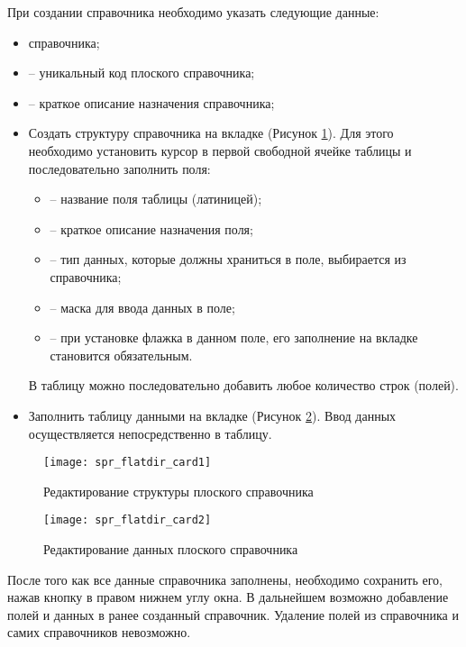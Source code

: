 При создании справочника необходимо указать следующие данные:
\begin{itemize}
 \item {} справочника;
 \item {} -- уникальный код плоского справочника;
 \item {} -- краткое описание назначения справочника;
 \item Создать структуру справочника на вкладке  (Рисунок \ref{img_spr_flatdir_card1}). Для этого необходимо установить курсор в первой свободной ячейке таблицы и последовательно заполнить поля:
  \begin{itemize}
   \item {} -- название поля таблицы (латиницей);
   \item {} -- краткое описание назначения поля;
   \item {} -- тип данных, которые должны храниться в поле, выбирается из справочника;
   \item {} -- маска для ввода данных в поле;
   \item {} -- при установке флажка в данном поле, его заполнение на вкладке  становится обязательным.
  \end{itemize}
 В таблицу можно последовательно добавить любое количество строк (полей).
 \item Заполнить таблицу данными на вкладке  (Рисунок \ref{img_spr_flatdir_card2}). Ввод данных осуществляется непосредственно в таблицу.
\end{itemize}

\begin{figure}[ht]\centering
 \texttt{[image: spr\_flatdir\_card1]}
 \caption{Редактирование структуры плоского справочника}
 \label{img_spr_flatdir_card1}
\end{figure} 

\begin{figure}[ht]\centering
 \texttt{[image: spr\_flatdir\_card2]}
 \caption{Редактирование данных плоского справочника}
 \label{img_spr_flatdir_card2}
\end{figure} 


После того как все данные справочника заполнены, необходимо сохранить его, нажав кнопку  в правом нижнем углу окна. В дальнейшем возможно добавление полей и данных в ранее созданный справочник. Удаление полей из справочника и самих справочников невозможно. 
 
